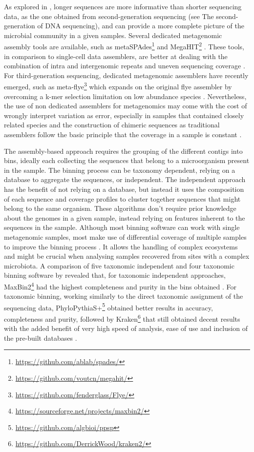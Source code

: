 As explored in , longer sequences are more informative than shorter sequencing data, as the one obtained from second-generation sequencing (see  The second-generation of \ac{DNA} sequencing), and can provide a more complete picture of the microbial community in a given samples. 
Several dedicated metagenomic assembly tools are available, such as metaSPAdes\footnote{\url{https://github.com/ablab/spades/}}  and MegaHIT\footnote{\url{https://github.com/voutcn/megahit/}} \citep{nurk_metaspades_2017, li_megahit_2015}. 
These tools, in comparison to single-cell data assemblers, are better at dealing with the combination of intra and intergenomic repeats and uneven sequencing coverage \citep{olson_metagenomic_2017}.
For third-generation sequencing, dedicated metagenomic assemblers have recently emerged, such as meta-flye\footnote{\url{https://github.com/fenderglass/Flye/}} which expands on the original flye assembler by overcoming a k-mer selection limitation on low abundance species \citep{kolmogorov_metaflye_2020}. Nevertheless, the use of non dedicated assemblers for metagenomics may come with the cost of wrongly interpret variation as error, especially in samples that contained closely related species and the construction of chimeric sequences as traditional assemblers follow the basic principle that the coverage in a sample is constant \citep{teeling_current_2012}. 

The assembly-based approach requires the grouping of the different contigs into bins, ideally each collecting the sequences that belong to a microorganism present in the sample. The binning process can be taxonomy dependent, relying on a database to aggregate the sequences, or independent. The independent approach has the benefit of not relying on a database, but instead it uses the composition of each sequence and coverage profiles to cluster together sequences that might belong to the same organism. These algorithms don’t require prior knowledge about the genomes in a given sample, instead relying on features inherent to the sequences in the sample. Although most binning software can work with single metagenomic samples, most make use of differential coverage of multiple samples to improve the binning process \citep{sedlar_bioinformatics_2017}. It allows the handling of complex ecosystems and might be crucial when analysing samples recovered from sites with a complex microbiota. A comparison of five taxonomic independent  and four taxonomic binning software by \cite{sczyrba_critical_2017} revealed that, for taxonomic independent approaches, MaxBin2\footnote{\url{https://sourceforge.net/projects/maxbin2/}} had the highest completeness and purity in the bins obtained \citep{wu_maxbin_2016}. For taxonomic binning, working similarly to the direct taxonomic assignment of the sequencing data, PhyloPythiaS+\footnote{\url{https://github.com/algbioi/ppsp}} obtained better results in accuracy, completeness and purity, followed by Kraken\footnote{\url{https://github.com/DerrickWood/kraken2/}} that still obtained decent results with the added benefit of very high speed of analysis, ease of use and inclusion of the pre-built databases \citep{gregor_phylopythias_2016, wood_kraken_2014}.

